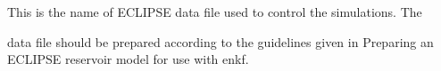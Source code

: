 \documentclass[letterpaper,10pt,english]{sphinxmanual}
\begin{document}
\label{\detokenize{keywords/index:data-file}}
\begin{sphinxShadowBox}

\begin{DUlineblock}{0em}
\item[] This is the name of ECLIPSE data file used to control the simulations. The
\end{DUlineblock}

data file should be prepared according to the guidelines given in Preparing an
ECLIPSE reservoir model for use with enkf.


%
\begin{sphinxVerbatim}[commandchars=\\\{\}]
      
 
\end{sphinxVerbatim}
\end{sphinxShadowBox}
\label{\detokenize{keywords/index:eclbase}}
\end{document}
